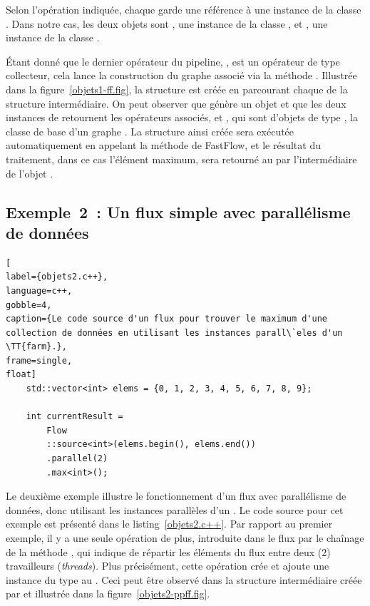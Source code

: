 Selon l'opération indiquée, chaque  garde une r\'ef\'erence \`a une instance de la classe . Dans notre cas, les deux objets  sont , une instance de la classe , et , une instance de la classe . 


\'Etant donn\'e que le dernier op\'erateur du {pipeline}, , est un op\'erateur de type collecteur, cela lance la construction du graphe  associ\'e via la m\'ethode . Illustr\'ee dans la figure~\ref{objets1-ff.fig}, la structure  est cr\'e\'ee en parcourant chaque  de la structure interm\'ediaire. On peut observer que  g\'en\`ere un objet  et que les deux instances de  retournent les op\'erateurs associés,  et , qui sont d'objets de type , la classe de base d'un graphe . La structure ainsi cr\'e\'ee sera ex\'ecut\'ee automatiquement en appelant la méthode  de FastFlow, et le r\'esultat du traitement, dans ce cas l'élément maximum, sera retourn\'e au  par l'interm\'ediaire de l'objet . 

 
\subsection{Exemple~2~: Un flux simple avec parallélisme de données}

\begin{lstlisting}[
label={objets2.c++},
language=c++,
gobble=4,
caption={Le code source d'un flux pour trouver le maximum d'une collection de données en utilisant les instances parall\`eles d'un \TT{farm}.},
frame=single,
float]
    std::vector<int> elems = {0, 1, 2, 3, 4, 5, 6, 7, 8, 9};

    int currentResult =
        Flow
        ::source<int>(elems.begin(), elems.end())
        .parallel(2)
        .max<int>();
\end{lstlisting}



Le deuxi\`eme exemple illustre le fonctionnement d'un flux avec parallélisme de données, donc utilisant les instances parall\`eles d'un . Le code source pour cet exemple est présenté dans le listing~\ref{objets2.c++}. Par rapport au premier exemple, il y a une seule op\'eration de plus, introduite dans le flux par le cha\^inage de la m\'ethode , qui indique de r\'epartir les \'el\'ements du flux entre deux (2) travailleurs (\emph{threads}). Plus précisément, cette op\'eration cr\'ee et ajoute une instance du type  au . Ceci peut \^etre observ\'e dans la structure interm\'ediaire cr\'e\'ee par  et illustr\'ee dans la figure~\ref{objets2-ppff.fig}.



